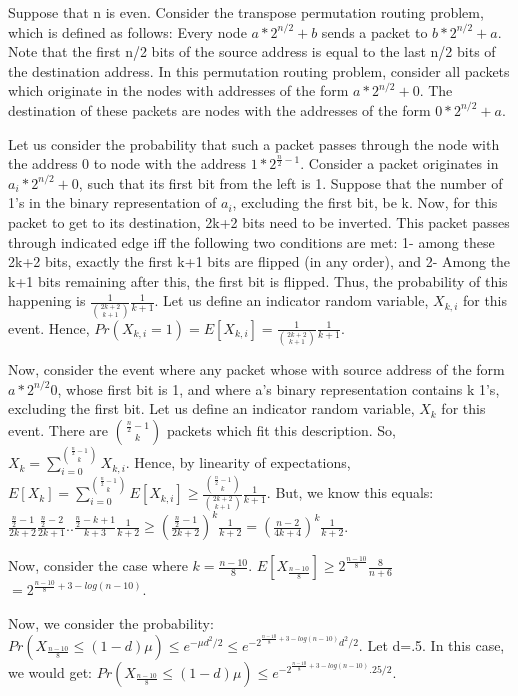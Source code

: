 \documentclass[10pt]{article}
\begin{document}
Suppose that n is even. Consider the transpose permutation routing problem, which is defined as follows: Every node $a*2^{n/2}+b$ sends a packet to $b*2^{n/2}+a$. Note that the first n/2 bits of the source address is equal to the last n/2 bits of the destination address. In this permutation routing problem, consider all packets which originate in the nodes with addresses of the form $a*2^{n/2}+0$. The destination of these packets are nodes with the addresses of the form $0*2^{n/2}+a$.

Let us consider the probability that such a packet passes through the node with the address 0 to node with the address $1*2^{\frac{n}{2}-1}$. Consider a packet originates in $a_{i}*2^{n/2}+0$, such that its first bit from the left is 1. Suppose that the number of 1's in the binary representation of $a_{i}$, excluding the first bit, be k. Now, for this packet to get to its destination, 2k+2 bits need to be inverted. This packet passes through indicated edge iff the following two conditions are met: 1- among these 2k+2 bits, exactly the first k+1 bits are flipped (in any order), and 2- Among the k+1 bits remaining after this, the first bit is flipped. Thus, the probability of this happening is $\frac{1}{\binom{2k+2}{k+1}}\frac{1}{k+1}$. Let us define an indicator random variable, $X_{k,i}$ for this event. Hence, $Pr(X_{k,i}=1)=E[X_{k,i}]=\frac{1}{\binom{2k+2}{k+1}}\frac{1}{k+1}$.

Now, consider the event where any packet whose with source address of the form $a*2^{n/2}0$, whose first bit is 1, and where a's binary representation contains k 1's, excluding the first bit. Let us define an indicator random variable, $X_{k}$ for this event. There are $\binom{\frac{n}{2}-1}{k}$ packets which fit this description. So, $X_{k}=\sum_{i=0}^{\binom{\frac{n}{2}-1}{k}} X_{k,i}$. Hence, by linearity of expectations, $E[X_{k}]= \sum_{i=0}^{\binom{\frac{n}{2}-1}{k}} E[X_{k,i}] \geq \frac{\binom{\frac{n}{2}-1}{k}}{\binom{2k+2}{k+1}}\frac{1}{k+1}$. But, we know this equals: $\frac{\frac{n}{2}-1}{2k+2}\frac{\frac{n}{2} - 2}{2k+1} .. \frac{\frac{n}{2}-k+1}{k+3}\frac{1}{k+2} \geq (\frac{\frac{n}{2}-1}{2k+2})^{k}\frac{1}{k+2} =(\frac{n-2}{4k+4})^{k}\frac{1}{k+2}$.

Now, consider the case where $k=\frac{n-10}{8}$. $E[X_{\frac{n-10}{8}}] \geq  2^{\frac{n-10}{8}}\frac{8}{n+6}$\\
$=2^{\frac{n-10}{8}+3-log(n-10)}$.

Now, we consider the probability: $Pr(X_{\frac{n-10}{8}}\leq (1-d)\mu) \leq e^{-\mu d^{2}/2} \leq e^{-2^{\frac{n-10}{8}+3-log(n-10)} d^{2}/2}$. \cite{mitzenmacherUpfal} Let d=.5. In this case, we would get: $Pr(X_{\frac{n-10}{8}}\leq (1-d)\mu) \leq e^{-2^{\frac{n-10}{8}+3-log(n-10)} .25/2}$.
\end{document}
